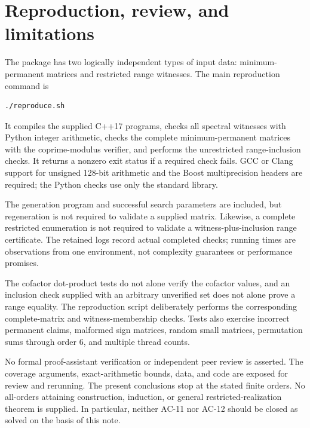 \documentclass[11pt,a4paper]{article}
\theoremstyle{remark}\newtheorem{remark}[theorem]{Remark}
\begin{document}
\section{Reproduction, review, and limitations}
The package has two logically independent types of input data: minimum-permanent matrices and restricted range witnesses. The main reproduction command is
\begin{Verbatim}[fontsize=\small]
./reproduce.sh
\end{Verbatim}
It compiles the supplied C++17 programs, checks all spectral witnesses with Python integer arithmetic, checks the complete minimum-permanent matrices with the coprime-modulus verifier, and performs the unrestricted range-inclusion checks. It returns a nonzero exit status if a required check fails. GCC or Clang support for unsigned 128-bit arithmetic and the Boost multiprecision headers are required; the Python checks use only the standard library.

The generation program and successful search parameters are included, but regeneration is not required to validate a supplied matrix. Likewise, a complete restricted enumeration is not required to validate a witness-plus-inclusion range certificate. The retained logs record actual completed checks; running times are observations from one environment, not complexity guarantees or performance promises.

The cofactor dot-product tests do not alone verify the cofactor values, and an inclusion check supplied with an arbitrary unverified set does not alone prove a range equality. The reproduction script deliberately performs the corresponding complete-matrix and witness-membership checks. Tests also exercise incorrect permanent claims, malformed sign matrices, random small matrices, permutation sums through order 6, and multiple thread counts.

No formal proof-assistant verification or independent peer review is asserted. The coverage arguments, exact-arithmetic bounds, data, and code are exposed for review and rerunning. The present conclusions stop at the stated finite orders. No all-orders attaining construction, induction, or general restricted-realization theorem is supplied. In particular, neither AC-11 nor AC-12 should be closed as solved on the basis of this note.

\clearpage
\appendix
\end{document}
